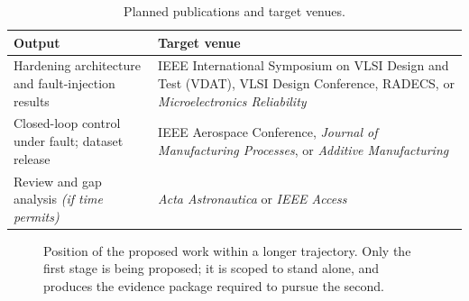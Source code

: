 \documentclass[11pt,a4paper]{article}
\begin{document}
\begin{table}[htbp]
\centering
\caption{Planned publications and target venues.}
\label{tab:pubs}
\small
\begin{tabularx}{\textwidth}{@{}X L{6.6cm}@{}}
\toprule
\textbf{Output} & \textbf{Target venue} \\
\midrule
Hardening architecture and fault-injection results &
IEEE International Symposium on VLSI Design and Test (VDAT), VLSI Design
Conference, RADECS, or \emph{Microelectronics Reliability} \\
Closed-loop control under fault; dataset release &
IEEE Aerospace Conference, \emph{Journal of Manufacturing Processes}, or
\emph{Additive Manufacturing} \\
Review and gap analysis \emph{(if time permits)} &
\emph{Acta Astronautica} or \emph{IEEE Access} \\
\bottomrule
\end{tabularx}
\end{table}

\begin{figure}[htbp]
\centering
{}
\caption{Position of the proposed work within a longer trajectory. Only the
first stage is being proposed; it is scoped to stand alone, and produces the
evidence package required to pursue the second.}
\label{fig:roadmap}
\end{figure}
\end{document}

